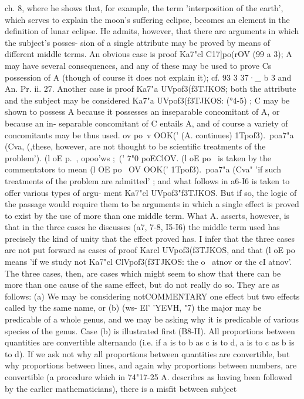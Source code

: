 {{{{{{{{{{{{{{{{{{{{{{{{{{{{{{{{{{{{{{{{{{{{{{{{{{{{{{{{{{{{{{{{{{{{{{{ch. 8, where he shows that, for example, the term 'interposition of
the earth', which serves to explain the moon's suffering eclipse,
becomes an element in the definition of lunar eclipse. He admits,
however, that there are arguments in which the subject's posses-
sion of a single attribute may be proved by means of different
middle terms. An obvious case is proof Ka7"cl C17]po(rOV (99 a 3); A
may have several consequences, and any of these may be used
to prove Cs possession of A (though of course it does not explain
it); cf. 93 3 37·_ b 3 and An. Pr. ii. 27. Another case is proof Ka7"a
UVpof3(f3TJKOS; both the attribute and the subject may be considered
Ka7"a UVpof3(f3TJKOS: (°4-5) ; C may be shown to possess A because it
possesses an inseparable concomitant of A, or because an in-
separable concomitant of C entails A, and of course a variety of
concomitants may be thus used. ov po~v OOK(' (A. continues)
1Tpof3).~poa7"a (Cva, (,these, however, are not thought to be scientific
treatments of the problem'). (l oE p.~, opoo'ws ;~(' 7"0 poEClOV. (l oE
po~ is taken by the commentators to mean (l OE po~ OV OOK('
1Tpof3).~poa7"a (Cva" 'if such treatments of the problem are admitted' ;
and what follows in a6-I6 is taken to offer various types of argu-
ment Ka7"cl UVpof3"f3TJKOS. But if so, the logic of the passage would
require them to be arguments in which a single effect is proved
to exist by the use of more than one middle term. What A. asserts,
however, is that in the three cases he discusses (a7, 7-8, I5-I6) the
middle term used has precisely the kind of unity that the effect
proved has. I infer that the three cases are not put forward as
cases of proof Karcl UVpof3(f3TJKOS, and that (l oE po~ means 'if we
study not Ka7"cl ClVpof3(f3TJKOS: the o~ atnov or the c{I atnov'.
The three cases, then, are cases which might seem to show that
there can be more than one cause of the same effect, but do not
really do so. They are as follows: (a) We may be considering notCOMMENTARY
one effect but two effects called by the same name, or (b) (ws- El'
'YEVH, "7) the major may be predicable of a whole genus, and we
may be asking why it is predicable of various species of the genus.
Case (b) is illustrated first (B8-II). All proportions between
quantities are convertible alternando (i.e. if a is to b as c is to d,
a is to c as b is to d). If we ask not why all proportions between
quantities are convertible, but why proportions between lines,
and again why proportions between numbers, are convertible (a
procedure which in 74"17-25 A. describes as having been followed
by the earlier mathematicians), there is a misfit between subject
}}}}}}}}}}}}}}}}}}}}}}}}}}}}}}}}}}}}}}}}}}}}}}}}}}}}}}}}}}}}}}}}}}}}}}}}
